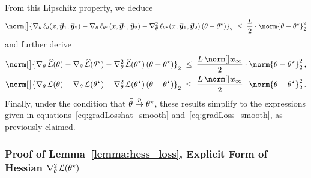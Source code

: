 	From this Lipschitz property, we deduce
	\begin{align*}
		\norm[\big]{\gradtheta \lliketheta (\prompt, \responsei{1}, \responsei{2}) - \gradtheta \llikethetastar (\prompt, \responsei{1}, \responsei{2}) - \hesstheta \llikethetastar (\prompt, \responsei{1}, \responsei{2}) \, (\paratheta - \parathetastar)}_2 \; \leq \; \frac{\Liphess}{2} \cdot \norm{\paratheta - \parathetastar}_2^2
	\end{align*}
	and further derive
	\begin{align*}
		\norm[\big]{\gradtheta \Losshat(\paratheta) - \gradtheta \Losshat(\parathetastar) - \hesstheta \Losshat(\parathetastar) \, (\paratheta - \parathetastar)}_2 & \; \leq \; \frac{\Liphess \, \supnorm{\weight}}{2} \cdot \norm{\paratheta - \parathetastar}_2^2 \, ,  \\
		\norm[\big]{\gradtheta \Loss(\paratheta) - \gradtheta \Loss(\parathetastar) - \hesstheta \Loss(\parathetastar) \, (\paratheta - \parathetastar)}_2 & \; \leq \; \frac{\Liphess \, \supnorm{\weight}}{2} \cdot \norm{\paratheta - \parathetastar}_2^2 \, .
	\end{align*}
	Finally, under the condition that $\widehat{\theta} \stackrel{p}{\rightarrow} \theta^{\star}$, these results simplify to the expressions given in equations~\eqref{eq:gradLosshat_smooth} and~\eqref{eq:gradLoss_smooth}, as previously claimed.
	
	
	
	\subsubsection{Proof of Lemma~\ref{lemma:hess_loss}, Explicit Form of Hessian $\nabla_{\theta}^2 \,  \mathcal{L}(\theta^{\star})$}
	\label{sec:proof:lemma:hess_loss}
	
